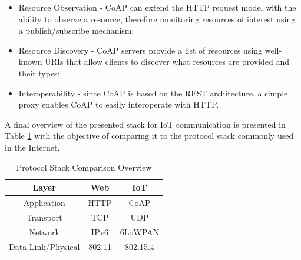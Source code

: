 \documentclass{sig-alternate-05-2015}
\begin{document}
\begin{itemize}
	\item Resource Observation - \gls{CoAP} can extend the \gls{HTTP} request model with the ability to observe a resource, therefore monitoring resources of interest using a publish/subscribe mechanism;
	\item Resource Discovery - \gls{CoAP} servers provide a list of resources using well-known {URIs} that allow clients to discover what resources are provided and their types;
	\item Interoperability - since \gls{CoAP} is based on the \gls{REST} architecture, a simple proxy enables \gls{CoAP} to easily interoperate with \gls{HTTP}.
\end{itemize}

A final overview of the presented stack for \gls{IoT} communication is presented in Table \ref{tab:stack} with the objective of comparing it to the protocol stack commonly used in the Internet.

\begin{table}[h]
	\centering
	\begin{center} \caption{Protocol Stack Comparison Overview } \label{tab:stack}\end{center}
	\begin{tabular}{c|c|c}
		Layer & Web & IoT \\
		\hline
		Application & \gls{HTTP} & \gls{CoAP} \\
		Transport & \gls{TCP} & \gls{UDP} \\
		Network & IPv6 & 6LoWPAN \\
		Data-Link/Physical & 802.11 & 802.15.4
	\end{tabular}
\end{table}
\end{document}
